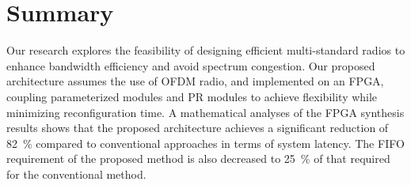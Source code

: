 \section{Summary}
Our research explores the feasibility of designing efficient multi-standard radios to enhance bandwidth efficiency and avoid spectrum congestion. 
Our proposed architecture assumes the use of OFDM radio, and implemented on an FPGA, coupling parameterized modules and PR modules to achieve flexibility while minimizing reconfiguration time.
A mathematical analyses of the FPGA synthesis results shows that the proposed architecture achieves a significant reduction of 82~\% compared to conventional approaches in terms of system latency. 
The FIFO requirement of the proposed method is also decreased to 25~\% of that required for the conventional method.
